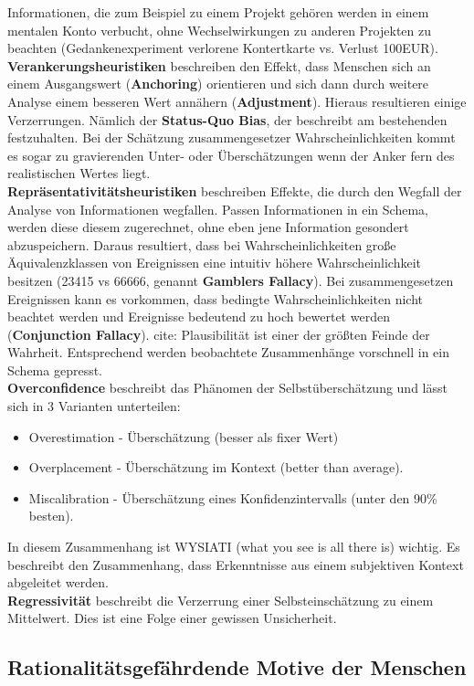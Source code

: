 Informationen, die zum Beispiel zu einem Projekt gehören werden in
einem mentalen Konto verbucht, ohne Wechselwirkungen zu anderen Projekten
zu beachten (Gedankenexperiment verlorene Kontertkarte vs. Verlust 100EUR). \\
\textbf{Verankerungsheuristiken} beschreiben den Effekt, dass Menschen sich
an einem Ausgangswert (\textbf{Anchoring}) orientieren und sich dann durch weitere Analyse einem
besseren Wert annähern (\textbf{Adjustment}). Hieraus resultieren
einige Verzerrungen. Nämlich der \textbf{Status-Quo Bias}, der beschreibt am bestehenden
festzuhalten. Bei der Schätzung zusammengesetzer Wahrscheinlichkeiten
kommt es sogar zu gravierenden Unter- oder Überschätzungen wenn der Anker fern
des realistischen Wertes liegt. \\
\textbf{Repräsentativitätsheuristiken} beschreiben Effekte, die durch den
Wegfall der Analyse von Informationen wegfallen. Passen Informationen
in ein Schema, werden diese diesem zugerechnet, ohne eben jene Information
gesondert abzuspeichern. Daraus resultiert, dass bei Wahrscheinlichkeiten
große Äquivalenzklassen von Ereignissen eine intuitiv höhere
Wahrscheinlichkeit besitzen (23415 vs 66666, genannt \textbf{Gamblers
Fallacy}). Bei zusammengesetzen
Ereignissen kann es vorkommen, dass bedingte Wahrscheinlichkeiten nicht
beachtet werden und Ereignisse bedeutend zu hoch bewertet werden
(\textbf{Conjunction Fallacy}). cite: Plausibilität ist einer der
größten Feinde der Wahrheit. Entsprechend werden beobachtete Zusammenhänge
vorschnell in ein Schema gepresst. \\

\textbf{Overconfidence} beschreibt das Phänomen der Selbstüberschätzung
und lässt sich in 3 Varianten unterteilen:
\begin{itemize}
    \item Overestimation - Überschätzung (besser als fixer Wert)
    \item Overplacement - Überschätzung im Kontext (better than average).
    \item Miscalibration - Überschätzung eines Konfidenzintervalls
        (unter den 90\% besten).
\end{itemize}
In diesem Zusammenhang ist WYSIATI (what you see is all there is) wichtig.
Es beschreibt den Zusammenhang, dass Erkenntnisse aus einem subjektiven
Kontext abgeleitet werden.\\
\textbf{Regressivität} beschreibt die Verzerrung einer Selbsteinschätzung
zu einem Mittelwert. Dies ist eine Folge einer gewissen Unsicherheit.

\subsection{Rationalitätsgefährdende Motive der Menschen}
